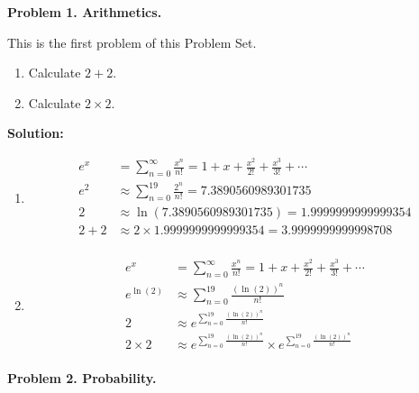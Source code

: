 \documentclass[11pt]{article}
\def\blue{\color{Turquoise}}
\def\purple{\color{Rhodamine}}
\def\white{\color{White}}
\def\orange{\color{Dandelion}}
\def\pb#1{{\blue \bf Problem #1.}\vskip 1pt \white}
\def\sol{\purple \textbf{Solution:}\hskip 8pt \white}
\begin{document}
\pagecolor{black}
\large

\pb{1. Arithmetics}

This is the first problem of this Problem Set.
\begin{enumerate}[label=\orange (\alph*)]
\item Calculate $2+2$.

\item Calculate $2 \times 2$.
\end{enumerate}

\sol

\begin{enumerate}[label=\orange (\alph*)]
\item

\begin{align*}
e^x &= \sum_{n=0}^{\infty} \frac{x^n}{n!} = 1 + x + \frac{x^2}{2!} + \frac{x^3}{3!} + \cdots \\
e^2 &\approx \sum_{n=0}^{19} \frac{2^n}{n!} = 7.3890560989301735 \\
2 &\approx \ln(7.3890560989301735) = 1.9999999999999354 \\
2 + 2 &\approx 2 \times 1.9999999999999354 = 3.9999999999998708 \\
\end{align*}

\item

\begin{align*}
e^x &= \sum_{n=0}^{\infty} \frac{x^n}{n!} = 1 + x + \frac{x^2}{2!} + \frac{x^3}{3!} + \cdots \\
e^{\ln(2)} &\approx \sum_{n=0}^{19} \frac{(\ln(2))^n}{n!} \\
2 &\approx e^{\sum_{n=0}^{19} \frac{(\ln(2))^n}{n!}} \\
2 \times 2 &\approx e^{\sum_{n=0}^{19} \frac{(\ln(2))^n}{n!}} \times e^{\sum_{n=0}^{19} \frac{(\ln(2))^n}{n!}} \\
\end{align*}

\end{enumerate}

\pb{2. Probability}
\end{document}
